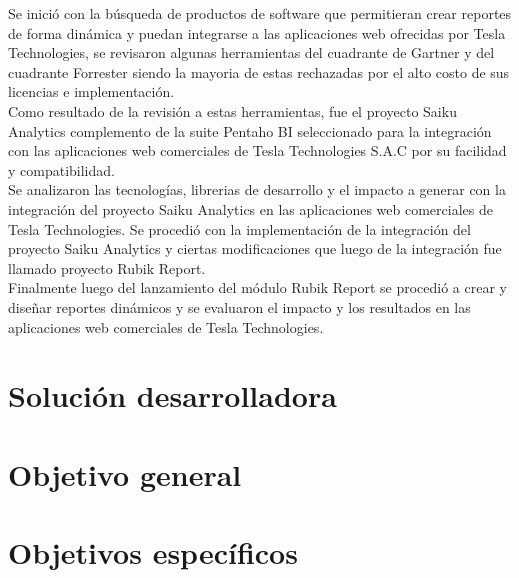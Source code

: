 \begin{spacing}{1.5}
	Se inició con la búsqueda de productos de software que permitieran crear reportes de forma dinámica y puedan integrarse a las aplicaciones web ofrecidas por Tesla Technologies, se revisaron algunas herramientas del cuadrante de Gartner y del cuadrante Forrester siendo la mayoria de estas rechazadas por el alto costo de sus licencias e implementación.\\
	Como resultado de la revisión a estas herramientas, fue el proyecto Saiku Analytics complemento de la suite Pentaho BI seleccionado para la integración con las aplicaciones web comerciales de Tesla Technologies S.A.C por su facilidad y compatibilidad.\\
	Se analizaron las tecnologías, librerias de desarrollo y el impacto a generar  con la integración del proyecto Saiku Analytics en las aplicaciones web comerciales de Tesla Technologies.
	Se procedió con la implementación de la integración del proyecto Saiku Analytics y ciertas modificaciones que luego de la integración fue llamado proyecto Rubik Report.\\
	Finalmente luego del lanzamiento del módulo Rubik Report se procedió a crear y diseñar reportes dinámicos y se evaluaron el impacto y los resultados en las aplicaciones web comerciales de Tesla Technologies.\\
	
\end{spacing}

\section{Soluci\'{o}n desarrolladora}
\begin{spacing}{1.5}
\end{spacing}
\section{Objetivo general}
\begin{spacing}{1.5}
\end{spacing}
\section{Objetivos espec\'{i}ficos}
\begin{spacing}{1.5}
\end{spacing}


	
